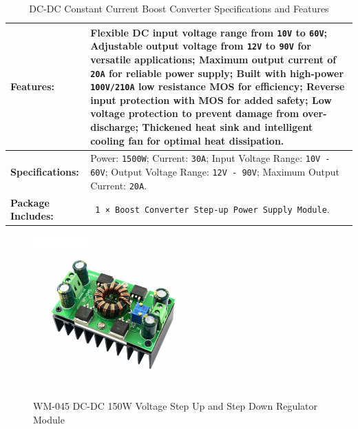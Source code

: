 \documentclass[../../main]{subfiles}
\begin{document}
    
\begin{table}[h!]
    \centering
    \begin{tabular}{|>{\bfseries}l|p{10cm}|} %
    \hline
    Features: & 
    Flexible DC input voltage range from \texttt{10V} to \texttt{60V}; 
    Adjustable output voltage from \texttt{12V} to \texttt{90V} for versatile applications; 
    Maximum output current of \texttt{20A} for reliable power supply; 
    Built with high-power \texttt{100V/210A} low resistance MOS for efficiency; 
    Reverse input protection with MOS for added safety; 
    Low voltage protection to prevent damage from over-discharge; 
    Thickened heat sink and intelligent cooling fan for optimal heat dissipation. \\ \hline
    Specifications: & 
    Power: \texttt{1500W}; 
    Current: \texttt{30A}; 
    Input Voltage Range: \texttt{10V - 60V}; 
    Output Voltage Range: \texttt{12V - 90V}; 
    Maximum Output Current: \texttt{20A}. \\ \hline
    Package Includes: & 
    \texttt{ 1 × Boost Converter Step-up Power Supply Module}. \\ \hline
    \end{tabular}
    \caption{DC-DC Constant Current Boost Converter Specifications and Features}
    \label{Stepper motor booster specifications} %
\end{table}

\newpage
\begin{figure}[H]
    \centering
\includegraphics[width=0.55\textwidth]{fig/actuator_booster.jpg}
\caption{WM-045 DC-DC 150W Voltage Step Up and Step Down Regulator Module }
\label{Linear actuator booster} %
\end{figure}
\end{document}
